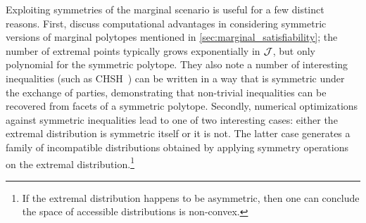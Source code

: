 \documentclass[aps, 10pt, english, twoside, pra, nofootinbib, tightenlines, longbibliography, superscriptaddress]{revtex4-1}
\begin{document}
    Exploiting symmetries of the marginal scenario is useful for a few distinct reasons. First, \citet{Bancal_2010} discuss computational advantages in considering symmetric versions of marginal polytopes mentioned in \cref{sec:marginal_satisfiability}; the number of extremal points typically grows exponentially in $\mathcal{J}$, but only polynomial for the symmetric polytope. They also note a number of interesting inequalities (such as CHSH~\cite{CHSH_Original}) can be written in a way that is symmetric under the exchange of parties, demonstrating that non-trivial inequalities can be recovered from facets of a symmetric polytope. Secondly, numerical optimizations against symmetric inequalities lead to one of two interesting cases: either the extremal distribution is symmetric itself or it is not. The latter case generates a family of incompatible distributions obtained by applying symmetry operations on the extremal distribution.\footnote{If the extremal distribution happens to be asymmetric, then one can conclude the space of accessible distributions is non-convex.}
\end{document}
